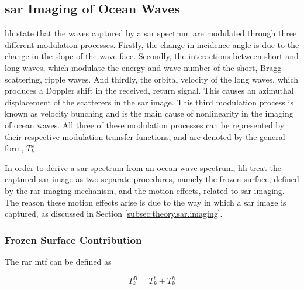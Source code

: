\subsection{\acs{sar} Imaging of Ocean Waves} \label{subsec:theory.hasselmann.sarImaging}

\acs{hh} \cite{Hasselmann1991} state that the waves captured by a \acs{sar} spectrum are modulated through three different modulation processes. Firstly, the change in incidence angle is due to the change in the slope of the wave face. Secondly, the interactions between short and long waves, which modulate the energy and wave number of the short, Bragg scattering, ripple waves. And thirdly, the orbital velocity of the long waves, which produces a Doppler shift in the received, return signal. This causes an azimuthal displacement of the scatterers in the \acs{sar} image. This third modulation process is known as velocity bunching and is the main cause of nonlinearity in the imaging of ocean waves. All three of these modulation processes can be represented by their respective modulation transfer functions, and are denoted by the general form, $T^x_k$.

In order to derive a \acs{sar} spectrum from an ocean wave spectrum, \acs{hh} treat the captured \acs{sar} image as two separate procedures, namely the frozen surface, defined by the \ac{rar} imaging mechanism, and the motion effects, related to \acs{sar} imaging. The reason these motion effects arise is due to the way in which a \acs{sar} image is captured, as discussed in Section \ref{subsec:theory.sar.imaging}.

\subsubsection{Frozen Surface Contribution} \label{subsubsec:theory.hasselmann.sarImaging.frozenSurface}


The \ac{rar} \ac{mtf} \cite{Hasselmann1991} can be defined as 

\begin{equation} \label{eq:hh.rar.TR_k_sum}
    T^R_k = T^t_k + T^h_k
\end{equation}

